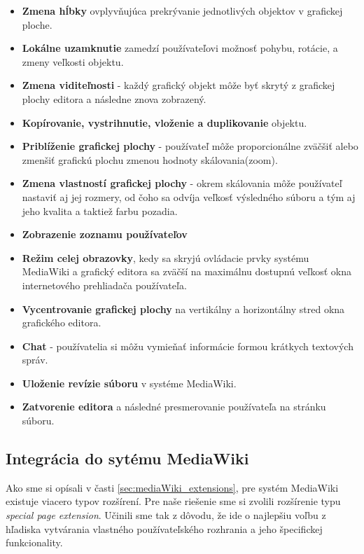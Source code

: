 \begin{itemize}
	\item \textbf{Zmena hĺbky} ovplyvňujúca prekrývanie jednotlivých objektov v grafickej ploche.
	
	\item \textbf{Lokálne uzamknutie} zamedzí používateľovi možnosť pohybu, rotácie, a zmeny veľkosti objektu.
	
	\item \textbf{Zmena viditeľnosti} - každý grafický objekt môže byť skrytý z grafickej plochy editora a následne znova zobrazený.
	
	\item \textbf{Kopírovanie, vystrihnutie, vloženie a duplikovanie} objektu.
	
	\item \textbf{Priblíženie grafickej plochy} - používateľ môže proporcionálne zväčšiť alebo zmenšiť grafickú plochu zmenou hodnoty skálovania(zoom).
	
	\item \textbf{Zmena vlastností grafickej plochy} - okrem skálovania môže používateľ nastaviť aj jej rozmery, od čoho sa odvíja veľkosť výsledného súboru a tým aj jeho kvalita a taktiež farbu pozadia. 
	
	\item \textbf{Zobrazenie zoznamu používateľov}
	
	\item \textbf{Režim celej obrazovky}, kedy sa skryjú ovládacie prvky systému MediaWiki a grafický editora sa zväčší na maximálnu dostupnú veľkosť okna internetového prehliadača používateľa.
	
	\item \textbf{Vycentrovanie grafickej plochy} na vertikálny a horizontálny stred okna grafického editora.
	
	\item \textbf{Chat} - používatelia si môžu vymieňať informácie formou krátkych textových správ. 
	
	\item \textbf{Uloženie revízie súboru} v systéme MediaWiki. 
	
	\item \textbf{Zatvorenie editora} a následné presmerovanie používateľa na stránku súboru.
\end{itemize}

\subsection{Integrácia do sytému MediaWiki}
Ako sme si opísali v časti \ref{sec:mediaWiki_extensions}, pre systém MediaWiki existuje viacero typov rozšírení. Pre naše riešenie sme si zvolili rozšírenie typu \textit{special page extension}. Učinili sme tak z dôvodu, že ide o najlepšiu voľbu z hľadiska vytvárania vlastného používateľského rozhrania a jeho špecifickej funkcionality. 

